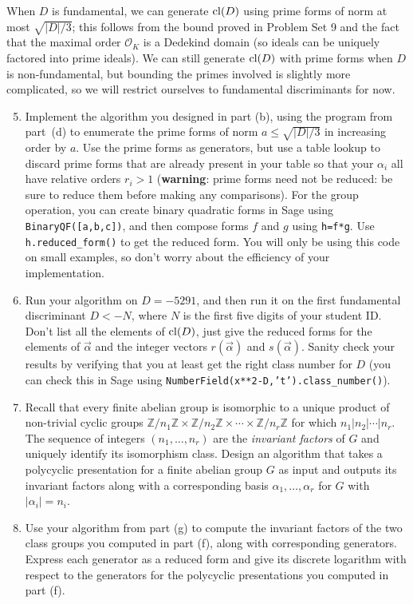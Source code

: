 \documentclass[11pt]{article}
\newcommand{\Z}{\mathbb{Z}}
\renewcommand{\O}{\mathcal{O}}
\newcommand{\cl}{{\rm cl}}
\theoremstyle{definition}
\begin{document}
When $D$ is fundamental, we can generate $\cl(D)$ using prime forms of norm at most $\sqrt{|D|/3}$; this follows from the bound proved in Problem Set 9 and the fact that the maximal order $\O_K$ is a Dedekind domain (so ideals can be uniquely factored into prime ideals).
We can still generate $\cl(D)$ with prime forms when $D$ is non-fundamental, but bounding the primes involved is slightly more complicated, so we will restrict ourselves to fundamental discriminants for now.

\begin{enumerate}[{\bf(a)}]
\setcounter{enumi}{4}
\item
Implement the algorithm you designed in part (b), using the program from part~(d) to enumerate the prime forms of norm $a\le \sqrt{|D|/3}$ in increasing order by $a$.  Use the prime forms as generators, but use a table lookup to discard prime forms that are already present in your table so that your $\alpha_i$ all have relative orders $r_i > 1$ (\textbf{warning}: prime forms need not be reduced: be sure to reduce them before making any comparisons).
For the group operation, you can create binary quadratic forms in Sage using \texttt{BinaryQF([a,b,c])}, and then compose forms $f$ and $g$ using \texttt{h=f*g}.  Use \texttt{h.reduced\_form()} to get the reduced form.
You will only be using this code on small examples, so don't worry about the efficiency of your implementation.

\item
Run your algorithm on $D=-5291$, and then run it on the first fundamental discriminant $D<-N$, where $N$ is the first five digits of your student ID.
Don't list all the elements of $\cl(D)$, just give the reduced forms for the elements of $\vec{\alpha}$ and the integer vectors $r(\vec{\alpha})$ and $s(\vec{\alpha})$.
Sanity check your results by verifying that you at least get the right class number for $D$ (you can check this in Sage using \texttt{NumberField(x**2-D,'t').class\_number()}).

\item
Recall that every finite abelian group is isomorphic to a unique product of non-trivial cyclic groups $\Z/n_1\Z\times\Z/n_2\Z\times\cdots\times\Z/n_r\Z$ for which $n_1|n_2|\cdots|n_r$.
The sequence of integers $(n_1,\ldots,n_r)$ are the \emph{invariant factors} of $G$ and uniquely identify its isomorphism class.  Design an algorithm that takes a polycyclic presentation for a finite abelian group $G$ as input and outputs its invariant factors along with a corresponding basis $\alpha_1,\ldots,\alpha_r$ for $G$ with $|\alpha_i|=n_i$.

\item Use your algorithm from part (g) to compute the invariant factors of the two class groups you computed in part (f), along with corresponding generators. Express each generator as a reduced form and give its discrete logarithm with respect to the generators for the polycyclic presentations you computed in part (f).  
\end{enumerate}
\end{document}
